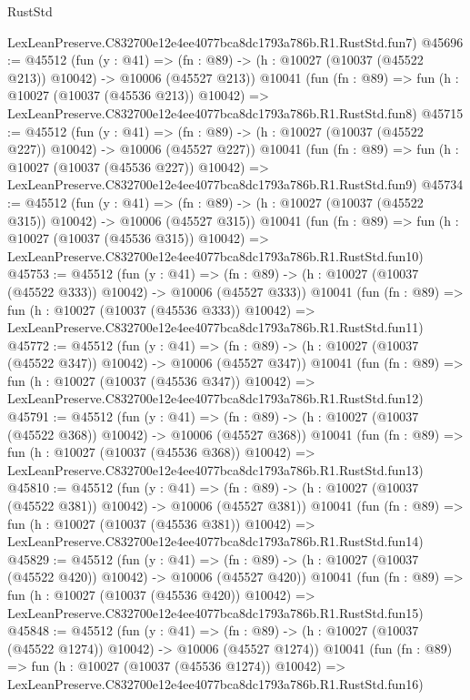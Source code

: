 \begin{lexlean}{RustStd}
\begin{coremodule}
    LexLeanPreserve.C832700e12e4ee4077bca8dc1793a786b.R1.RustStd.fun7)
@45696 := @45512
    (fun (y : @41) =>
    (fn : @89) -> (h : @10027 (@10037 (@45522 @213)) @10042) -> @10006 (@45527 @213))
    @10041
    (fun (fn : @89) =>
    fun (h : @10027 (@10037 (@45536 @213)) @10042) =>
    LexLeanPreserve.C832700e12e4ee4077bca8dc1793a786b.R1.RustStd.fun8)
@45715 := @45512
    (fun (y : @41) =>
    (fn : @89) -> (h : @10027 (@10037 (@45522 @227)) @10042) -> @10006 (@45527 @227))
    @10041
    (fun (fn : @89) =>
    fun (h : @10027 (@10037 (@45536 @227)) @10042) =>
    LexLeanPreserve.C832700e12e4ee4077bca8dc1793a786b.R1.RustStd.fun9)
@45734 := @45512
    (fun (y : @41) =>
    (fn : @89) -> (h : @10027 (@10037 (@45522 @315)) @10042) -> @10006 (@45527 @315))
    @10041
    (fun (fn : @89) =>
    fun (h : @10027 (@10037 (@45536 @315)) @10042) =>
    LexLeanPreserve.C832700e12e4ee4077bca8dc1793a786b.R1.RustStd.fun10)
@45753 := @45512
    (fun (y : @41) =>
    (fn : @89) -> (h : @10027 (@10037 (@45522 @333)) @10042) -> @10006 (@45527 @333))
    @10041
    (fun (fn : @89) =>
    fun (h : @10027 (@10037 (@45536 @333)) @10042) =>
    LexLeanPreserve.C832700e12e4ee4077bca8dc1793a786b.R1.RustStd.fun11)
@45772 := @45512
    (fun (y : @41) =>
    (fn : @89) -> (h : @10027 (@10037 (@45522 @347)) @10042) -> @10006 (@45527 @347))
    @10041
    (fun (fn : @89) =>
    fun (h : @10027 (@10037 (@45536 @347)) @10042) =>
    LexLeanPreserve.C832700e12e4ee4077bca8dc1793a786b.R1.RustStd.fun12)
@45791 := @45512
    (fun (y : @41) =>
    (fn : @89) -> (h : @10027 (@10037 (@45522 @368)) @10042) -> @10006 (@45527 @368))
    @10041
    (fun (fn : @89) =>
    fun (h : @10027 (@10037 (@45536 @368)) @10042) =>
    LexLeanPreserve.C832700e12e4ee4077bca8dc1793a786b.R1.RustStd.fun13)
@45810 := @45512
    (fun (y : @41) =>
    (fn : @89) -> (h : @10027 (@10037 (@45522 @381)) @10042) -> @10006 (@45527 @381))
    @10041
    (fun (fn : @89) =>
    fun (h : @10027 (@10037 (@45536 @381)) @10042) =>
    LexLeanPreserve.C832700e12e4ee4077bca8dc1793a786b.R1.RustStd.fun14)
@45829 := @45512
    (fun (y : @41) =>
    (fn : @89) -> (h : @10027 (@10037 (@45522 @420)) @10042) -> @10006 (@45527 @420))
    @10041
    (fun (fn : @89) =>
    fun (h : @10027 (@10037 (@45536 @420)) @10042) =>
    LexLeanPreserve.C832700e12e4ee4077bca8dc1793a786b.R1.RustStd.fun15)
@45848 := @45512
    (fun (y : @41) =>
    (fn : @89) -> (h : @10027 (@10037 (@45522 @1274)) @10042) -> @10006 (@45527 @1274))
    @10041
    (fun (fn : @89) =>
    fun (h : @10027 (@10037 (@45536 @1274)) @10042) =>
    LexLeanPreserve.C832700e12e4ee4077bca8dc1793a786b.R1.RustStd.fun16)

\end{coremodule}
\end{lexlean}
